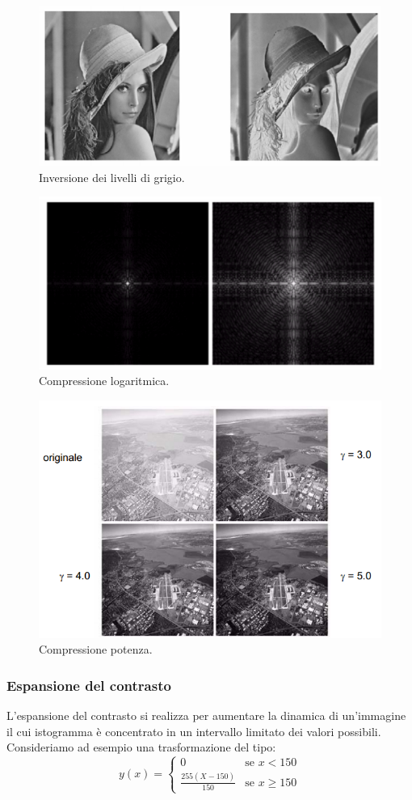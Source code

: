 \begin{figure}[h]
\centering
\includegraphics[width=.5\textwidth]{img/inversione-grigio.png}
\caption{Inversione dei livelli di grigio.}\label{fig:inversione-grigio}
\end{figure}
\begin{figure}[h]
\centering
\includegraphics[width=.5\textwidth]{img/compressione-logaritmica.png}
\caption{Compressione logaritmica.}\label{fig:compressione-logaritmica}
\end{figure}
\begin{figure}[h]
\centering
\includegraphics[width=.5\textwidth]{img/compressione-potenza.png}
\caption{Compressione potenza.}\label{fig:compressione-potenza}
\end{figure}

\subsubsection{Espansione del contrasto}
L'espansione del contrasto si realizza per aumentare la dinamica di 
un'immagine il cui istogramma è concentrato 
in un intervallo limitato dei valori possibili.
Consideriamo ad esempio una trasformazione del tipo:
\[
y(x) =
  \begin{cases}
   0       & \text{se } x < 150 \\
   \frac{255  (X-150)}{150}       & \text{se } x \geq 150
  \end{cases}
\]

